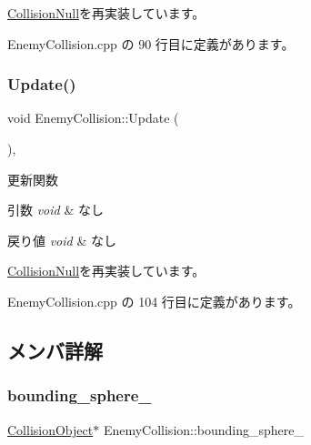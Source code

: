 \mbox{\hyperlink{class_collision_null_a7c6d0ec502efc55e2f406415451152f5}{Collision\+Null}}を再実装しています。



 Enemy\+Collision.\+cpp の 90 行目に定義があります。

\mbox{\label{class_enemy_collision_ab54133504d867c6d2070d2f3854a0aaf}} 
\subsubsection{\texorpdfstring{Update()}{Update()}}
{\footnotesize\ttfamily void Enemy\+Collision\+::\+Update (\begin{DoxyParamCaption}{ }\end{DoxyParamCaption})\hspace{0.3cm}{\ttfamily [override]}, {\ttfamily [virtual]}}



更新関数 


\begin{DoxyParams}{引数}
{\em void} & なし \\
\hline
\end{DoxyParams}

\begin{DoxyRetVals}{戻り値}
{\em void} & なし \\
\hline
\end{DoxyRetVals}


\mbox{\hyperlink{class_collision_null_a5e5e094e3fbe3ccc0515e485c739bd15}{Collision\+Null}}を再実装しています。



 Enemy\+Collision.\+cpp の 104 行目に定義があります。



\subsection{メンバ詳解}
\mbox{\label{class_enemy_collision_a065309bed90f1b2e3539cb9859bc06ef}} 
\subsubsection{\texorpdfstring{bounding\+\_\+sphere\+\_\+}{bounding\_sphere\_}}
{\footnotesize\ttfamily \mbox{\hyperlink{class_collision_object}{Collision\+Object}}$\ast$ Enemy\+Collision\+::bounding\+\_\+sphere\+\_\+\hspace{0.3cm}{\ttfamily [private]}}



